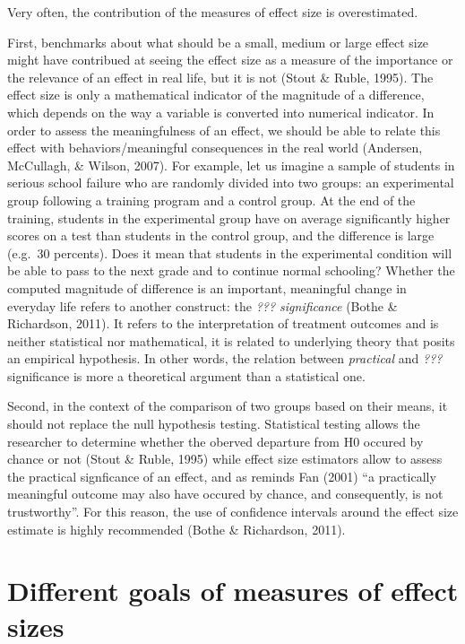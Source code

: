 \documentclass[man]{apa6}
\begin{document}
Very often, the contribution of the measures of effect size is overestimated.

First, benchmarks about what should be a small, medium or large effect size might have contribued at seeing the effect size as a measure of the importance or the relevance of an effect in real life, but it is not (Stout \& Ruble, 1995). The effect size is only a mathematical indicator of the magnitude of a difference, which depends on the way a variable is converted into numerical indicator. In order to assess the meaningfulness of an effect, we should be able to relate this effect with behaviors/meaningful consequences in the real world (Andersen, McCullagh, \& Wilson, 2007). For example, let us imagine a sample of students in serious school failure who are randomly divided into two groups: an experimental group following a training program and a control group. At the end of the training, students in the experimental group have on average significantly higher scores on a test than students in the control group, and the difference is large (e.g.~30 percents). Does it mean that students in the experimental condition will be able to pass to the next grade and to continue normal schooling? Whether the computed magnitude of difference is an important, meaningful change in everyday life refers to another construct: the \emph{??? significance} (Bothe \& Richardson, 2011). It refers to the interpretation of treatment outcomes and is neither statistical nor mathematical, it is related to underlying theory that posits an empirical hypothesis. In other words, the relation between \emph{practical} and \emph{???} significance is more a theoretical argument than a statistical one.

Second, in the context of the comparison of two groups based on their means, it should not replace the null hypothesis testing. Statistical testing allows the researcher to determine whether the oberved departure from H0 occured by chance or not (Stout \& Ruble, 1995) while effect size estimators allow to assess the practical signficance of an effect, and as reminds Fan (2001) \enquote{a practically meaningful outcome may also have occured by chance, and consequently, is not trustworthy}. For this reason, the use of confidence intervals around the effect size estimate is highly recommended (Bothe \& Richardson, 2011).

\hypertarget{different-goals-of-measures-of-effect-sizes}{%
\section{Different goals of measures of effect sizes}\label{different-goals-of-measures-of-effect-sizes}}
\end{document}
